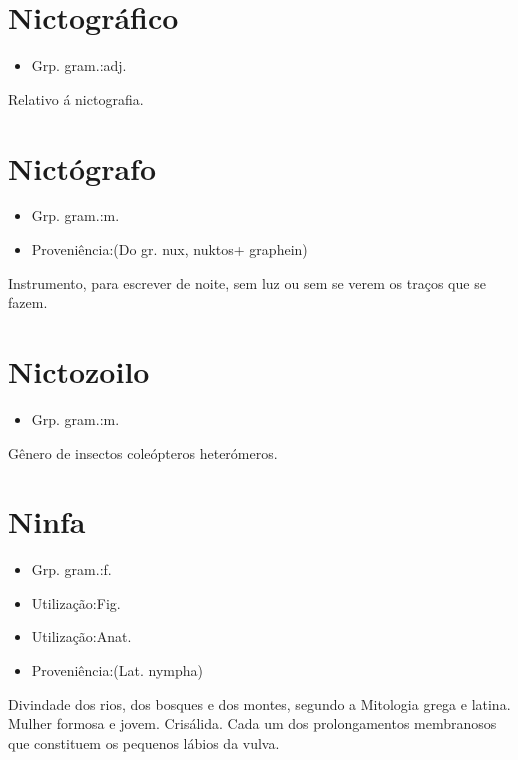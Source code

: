 \section{Nictográfico}
\begin{itemize}
\item {Grp. gram.:adj.}
\end{itemize}
Relativo á nictografia.
\section{Nictógrafo}
\begin{itemize}
\item {Grp. gram.:m.}
\end{itemize}
\begin{itemize}
\item {Proveniência:(Do gr. \textunderscore nux\textunderscore , \textunderscore nuktos\textunderscore  + \textunderscore graphein\textunderscore )}
\end{itemize}
Instrumento, para escrever de noite, sem luz ou sem se verem os traços que se fazem.
\section{Nictozoilo}
\begin{itemize}
\item {Grp. gram.:m.}
\end{itemize}
Gênero de insectos coleópteros heterómeros.
\section{Ninfa}
\begin{itemize}
\item {Grp. gram.:f.}
\end{itemize}
\begin{itemize}
\item {Utilização:Fig.}
\end{itemize}
\begin{itemize}
\item {Utilização:Anat.}
\end{itemize}
\begin{itemize}
\item {Proveniência:(Lat. \textunderscore nympha\textunderscore )}
\end{itemize}
Divindade dos rios, dos bosques e dos montes, segundo a Mitologia grega e latina.
Mulher formosa e jovem.
Crisálida.
Cada um dos prolongamentos membranosos que constituem os pequenos lábios da vulva.
